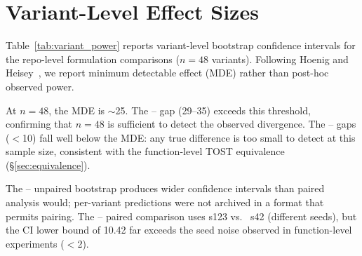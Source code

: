 \section{Variant-Level Effect Sizes}
\label{app:power}

Table~\ref{tab:variant_power} reports variant-level bootstrap confidence intervals for the repo-level formulation comparisons ($n{=}48$ variants). Following Hoenig and Heisey~\cite{hoenig2001}, we report minimum detectable effect (MDE) rather than post-hoc observed power.

\begin{table}[h]
\centering
\small
\caption{Variant-level bootstrap analysis ($n{=}48$). \cls{}--\cwm{} uses paired bootstrap (same variants, same seed); \cls{}--\traj{} uses unpaired bootstrap (per-variant \traj{} predictions not archived for pairing). MDE at $n{=}48$: ${\sim}$25\pp{}.}
\label{tab:variant_power}
\setlength{\tabcolsep}{3pt}
\end{table}

At $n{=}48$, the MDE is ${\sim}$25\pp{}. The \cls{}--\cwm{} gap (29--35\pp{}) exceeds this threshold, confirming that $n{=}48$ is sufficient to detect the observed divergence. The \cls{}--\traj{} gaps ($<$10\pp{}) fall well below the MDE: any true difference is too small to detect at this sample size, consistent with the function-level TOST equivalence (\S\ref{sec:equivalence}).

The \cls{}--\traj{} unpaired bootstrap produces wider confidence intervals than paired analysis would; \traj{} per-variant predictions were not archived in a format that permits pairing. The \cls{}--\cwm{} paired comparison uses \cls{} s123 vs.\ \cwm{} s42 (different seeds), but the CI lower bound of 10.42\pp{} far exceeds the seed noise observed in function-level experiments ($<$2\pp{}).


